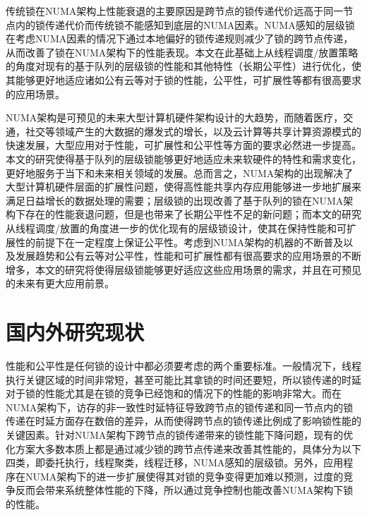 传统锁在NUMA架构上性能衰退的主要原因是跨节点的锁传递代价远高于同一节点内的锁传递代价而传统锁不能感知到底层的NUMA因素。NUMA感知的层级锁在考虑NUMA因素的情况下通过本地偏好的锁传递规则减少了锁的跨节点传递，从而改善了锁在NUMA架构下的性能表现。本文在此基础上从线程调度/放置策略的角度对现有的基于队列的层级锁的性能和其他特性（长期公平性）进行优化，使其能够更好地适应诸如公有云等对于锁的性能，公平性，可扩展性等都有很高要求的应用场景。

NUMA架构是可预见的未来大型计算机硬件架构设计的大趋势，而随着医疗，交通，社交等领域产生的大数据的爆发式的增长，以及云计算等共享计算资源模式的快速发展，大型应用对于性能，可扩展性和公平性等方面的要求必然进一步提高。本文的研究使得基于队列的层级锁能够更好地适应未来软硬件的特性和需求变化，更好地服务于当下和未来相关领域的发展。总而言之，NUMA架构的出现解决了大型计算机硬件层面的扩展性问题，使得高性能共享内存应用能够进一步地扩展来满足日益增长的数据处理的需要；层级锁的出现改善了基于队列的锁在NUMA架构下存在的性能衰退问题，但是也带来了长期公平性不足的新问题；而本文的研究从线程调度/放置的角度进一步的优化现有的层级锁设计，使其在保持性能和可扩展性的前提下在一定程度上保证公平性。考虑到NUMA架构的机器的不断普及以及发展趋势和公有云等对公平性，性能和可扩展性都有很高要求的应用场景的不断增多，本文的研究将使得层级锁能够更好适应这些应用场景的需求，并且在可预见的未来有更大应用前景。
\section{国内外研究现状}
性能和公平性是任何锁的设计中都必须要考虑的两个重要标准\cite{chabbi2015high}。一般情况下，线程执行关键区域的时间非常短，甚至可能比其拿锁的时间还要短\cite{johnson2010decoupling}，所以锁传递的时延对于锁的性能尤其是在锁的竞争已经饱和的情况下的性能的影响非常大。而在NUMA架构下，访存的非一致性时延特征导致跨节点的锁传递和同一节点内的锁传递在时延方面存在数倍的差异，从而使得跨节点的锁传递比例成了影响锁性能的关键因素。针对NUMA架构下跨节点的锁传递带来的锁性能下降问题，现有的优化方案大多数本质上都是通过减少锁的跨节点传递来改善其性能的，具体分为以下四类，即委托执行，线程聚类，线程迁移，NUMA感知的层级锁。另外，应用程序在NUMA架构下的进一步扩展使得其对锁的竞争变得更加难以预测，过度的竞争反而会带来系统整体性能的下降，所以通过竞争控制也能改善NUMA架构下锁的性能。

